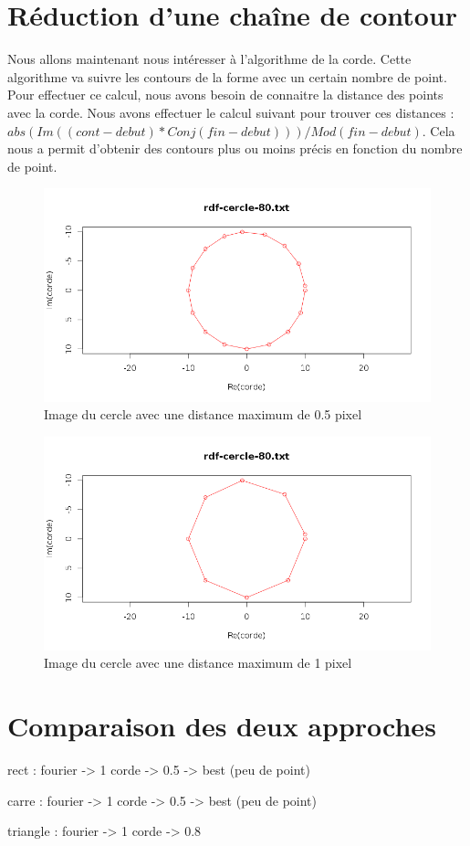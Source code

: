 \documentclass[11pt]{article}
\begin{document}
  \section{Réduction d'une chaîne de contour}
  Nous allons maintenant nous intéresser à l'algorithme de la corde. Cette algorithme va
  suivre les contours de la forme avec un certain nombre de point. Pour effectuer ce
  calcul, nous avons besoin de connaitre la distance des points avec la corde. Nous avons
  effectuer le calcul suivant pour trouver ces distances : 
  $abs(Im((cont - debut) * Conj(fin - debut))) / Mod(fin - debut)$.
  Cela nous a permit d'obtenir des contours plus ou moins précis en fonction du nombre
  de point.
  
  \begin{center}
    \begin{figure}[!h]
      \includegraphics[width=15cm]{../resultat/cercle-corde-5.png}
      \caption{Image du cercle avec une distance maximum de 0.5 pixel}
    \end{figure}
  \end{center}
  
  \begin{center}
    \begin{figure}[!h]
      \includegraphics[width=15cm]{../resultat/cercle-corde-10.png}
      \caption{Image du cercle avec une distance maximum de 1 pixel}
    \end{figure}
  \end{center}
  
  \newpage
  
  \section{Comparaison des deux approches}
  rect :
    fourier -> 1
    corde -> 0.5 -> best (peu de point)
    
  carre :
    fourier -> 1
    corde -> 0.5 -> best (peu de point)
    
  triangle :
    fourier -> 1
    corde -> 0.8
    
\end{document}
